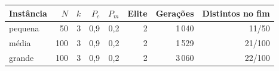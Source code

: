 \begin{tabular}{lrrrrrrr}
\toprule
Instância & $N$ & $k$ & $P_c$ & $P_m$ & Elite & Gerações & Distintos no fim \\
\midrule
pequena & 50 & 3 & 0,9 & 0,2 & 2 & 1\,040 & 11/50 \\
média & 100 & 3 & 0,9 & 0,2 & 2 & 1\,529 & 21/100 \\
grande & 100 & 3 & 0,9 & 0,2 & 2 & 3\,060 & 22/100 \\
\bottomrule
\end{tabular}
